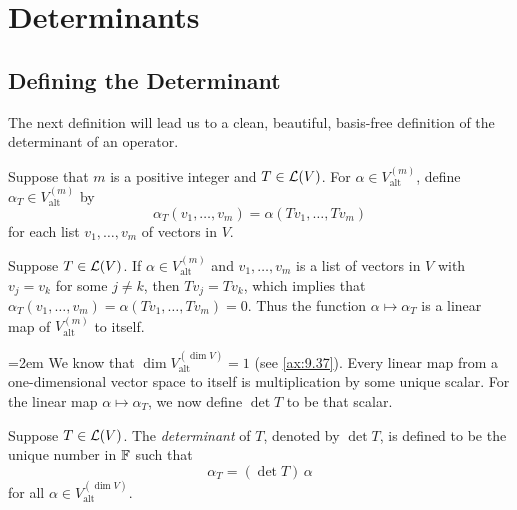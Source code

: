 \section{Determinants}

\subsection{Defining the Determinant}

The next definition will lead us to a clean, beautiful, basis-free definition
of the determinant of an operator.

\begin{definition}[$\alpha_T$]\label{ax:9.40}
Suppose that $m$ is a positive integer and $T\in\mathcal{L}(V)$. For
$\alpha\in V_{\mathrm{alt}}^{(m)}$, define $\alpha_T\in V_{\mathrm{alt}}^{(m)}$
by
\[ \alpha_T(v_1,\dots,v_m) = \alpha(Tv_1,\dots,Tv_m) \]
for each list $v_1,\dots,v_m$ of vectors in $V$.
\end{definition}

Suppose $T\in\mathcal{L}(V)$. If $\alpha\in V_{\mathrm{alt}}^{(m)}$ and
$v_1,\dots,v_m$ is a list of vectors in $V$ with $v_j=v_k$ for some $j\ne k$,
then $Tv_j=Tv_k$, which implies that
$\alpha_T(v_1,\dots,v_m)=\alpha(Tv_1,\dots,Tv_m)=0$. Thus the function
$\alpha\mapsto\alpha_T$ is a linear map of $V_{\mathrm{alt}}^{(m)}$ to itself.

\begingroup\emergencystretch=2em
We know that $\dim V_{\mathrm{alt}}^{(\dim V)}=1$ (see \ref{ax:9.37}). Every
linear map from a one-dimensional vector space to itself is multiplication by
some unique scalar. For the linear map $\alpha\mapsto\alpha_T$, we now define
$\det T$ to be that scalar.\par\endgroup

\begin{definition}\label{ax:9.41}
Suppose $T\in\mathcal{L}(V)$. The \emph{determinant} of $T$, denoted by $\det T$, is
defined to be the unique number in $\mathbb{F}$ such that
\[ \alpha_T = (\det T)\,\alpha \]
for all $\alpha\in V_{\mathrm{alt}}^{(\dim V)}$.
\end{definition}


